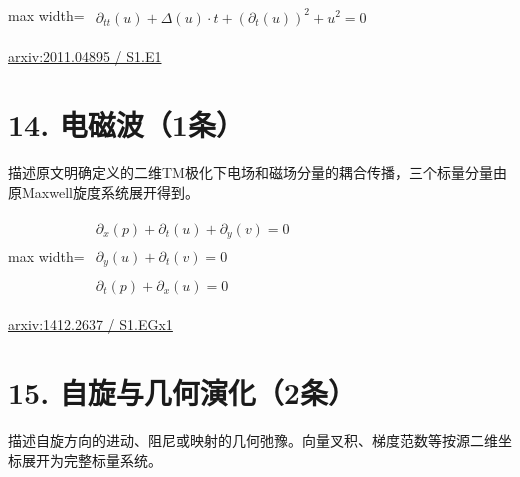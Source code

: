 \documentclass[UTF8,10pt,a4paper,fontset=mac]{ctexart}
\begin{document}
\begin{minipage}{\linewidth}\begin{center}\begin{adjustbox}{max width=\linewidth}$\displaystyle\begin{gathered}\begin{gathered}\partial_{tt}(u)+\Delta(u)\cdot t+(\partial_{t}(u))^{2}+u^{2}=0\end{gathered}\end{gathered}$\end{adjustbox}\end{center}{\small\href{https://arxiv.org/html/2011.04895#S1.E1}{arxiv:2011.04895 / S1.E1}}\par\end{minipage}\par\vspace{6mm}

\section*{14. 电磁波（1条）}
描述原文明确定义的二维TM极化下电场和磁场分量的耦合传播，三个标量分量由原Maxwell旋度系统展开得到。\par\medskip

\begin{minipage}{\linewidth}\begin{center}\begin{adjustbox}{max width=\linewidth}$\displaystyle\begin{gathered}\begin{gathered}\partial_{x}(p)+\partial_{t}(u)+\partial_{y}(v)=0\end{gathered}\\[5pt]\begin{gathered}\partial_{y}(u)+\partial_{t}(v)=0\end{gathered}\\[5pt]\begin{gathered}\partial_{t}(p)+\partial_{x}(u)=0\end{gathered}\end{gathered}$\end{adjustbox}\end{center}{\small\href{https://arxiv.org/html/1412.2637#S1.EGx1}{arxiv:1412.2637 / S1.EGx1}}\par\end{minipage}\par\vspace{6mm}

\section*{15. 自旋与几何演化（2条）}
描述自旋方向的进动、阻尼或映射的几何弛豫。向量叉积、梯度范数等按源二维坐标展开为完整标量系统。\par\medskip
\end{document}
